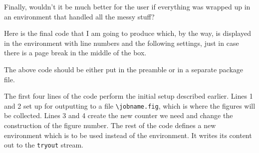 {{{{    Finally, wouldn't it be much better for the user if everything was
wrapped up in an environment that handled all the messy stuff?

    Here is the final code that I am going to produce which, by the way,
is displayed in the  environment 
with line numbers and the following settings, just in case there is
a page break in the middle of the box.
    The above code should be either put in the preamble 
or in a separate package file.

   The first four lines of the code perform the initial setup described
earlier. Lines 1 and 2 set up for outputting to a file 
\verb?\jobname.fig?, which
is where the figures will be collected. Lines 3 and 4 create the 
new counter
we need and change the construction of the figure number. The rest of the code
defines a new environment  
which is to be used instead 
of the  environment. It writes its content out to the 
\texttt{tryout} stream.

}}}}
